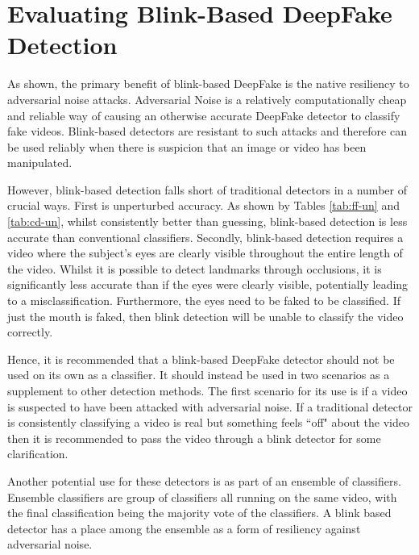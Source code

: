 \section{Evaluating Blink-Based DeepFake Detection}


As shown, the primary benefit of blink-based DeepFake is the native resiliency to adversarial noise attacks. Adversarial Noise is a relatively computationally cheap and reliable way of causing an otherwise accurate DeepFake detector to classify fake videos. Blink-based detectors are resistant to such attacks and therefore can be used reliably when there is suspicion that an image or video has been manipulated.

However, blink-based detection falls short of traditional detectors in a number of crucial ways. First is unperturbed accuracy. As shown by Tables \ref{tab:ff-un} and \ref{tab:cd-un}, whilst consistently better than guessing, blink-based detection is less accurate than conventional classifiers. Secondly, blink-based detection requires a video where the subject's eyes are clearly visible throughout the entire length of the video. Whilst it is possible to detect landmarks through occlusions, it is significantly less accurate than if the eyes were clearly visible, potentially leading to a misclassification. Furthermore, the eyes need to be faked to be classified. If just the mouth is faked, then blink detection will be unable to classify the video correctly.

Hence, it is recommended that a blink-based DeepFake detector should not be used on its own as a classifier. It should instead be used in two scenarios as a supplement to other detection methods. The first scenario for its use is if a video is suspected to have been attacked with adversarial noise. If a traditional detector is consistently classifying a video is real but something feels ``off" about the video then it is recommended to pass the video through a blink detector for some clarification. 

Another potential use for these detectors is as part of an ensemble of classifiers. Ensemble classifiers are group of classifiers all running on the same video, with the final classification being the majority vote of the classifiers. A blink based detector has a place among the ensemble as a form of resiliency against adversarial noise.